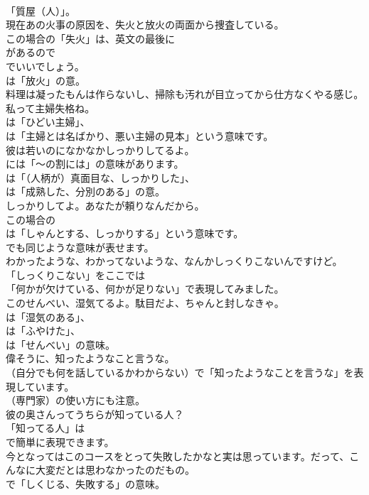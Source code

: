 \documentclass[8pt]{extreport}
\begin{document}
\begin{CJK}{UTF8}{min}
\\	「質屋（人）」。	
\\	現在あの火事の原因を、失火と放火の両面から捜査している。 
\\	この場合の「失火」は、英文の最後に 
\\	があるので 
\\	でいいでしょう。
\\	は「放火」の意。	
\\	料理は凝ったもんは作らないし、掃除も汚れが目立ってから仕方なくやる感じ。私って主婦失格ね。 
\\	は「ひどい主婦」、
\\	は「主婦とは名ばかり、悪い主婦の見本」という意味です。	
\\	彼は若いのになかなかしっかりしてるよ。 
\\	には「～の割には」の意味があります。
\\	は「（人柄が）真面目な、しっかりした」、
\\	は「成熟した、分別のある」の意。	
\\	しっかりしてよ。あなたが頼りなんだから。 
\\	この場合の
\\	は「しゃんとする、しっかりする」という意味です。
\\	でも同じような意味が表せます。	
\\	わかったような、わかってないような、なんかしっくりこないんですけど。 
\\	「しっくりこない」をここでは
\\	「何かが欠けている、何かが足りない」で表現してみました。	
\\	このせんべい、湿気てるよ。駄目だよ、ちゃんと封しなきゃ。 
\\	は「湿気のある」、
\\	は「ふやけた」、
\\	は「せんべい」の意味。	
\\	偉そうに、知ったようなこと言うな。 
\\	（自分でも何を話しているかわからない）で「知ったようなことを言うな」を表現しています。
\\	（専門家）の使い方にも注意。	
\\	彼の奥さんってうちらが知っている人？ 
\\	「知ってる人」は
\\	で簡単に表現できます。	
\\	今となってはこのコースをとって失敗したかなと実は思っています。だって、こんなに大変だとは思わなかったのだもの。 
\\	で「しくじる、失敗する」の意味。

\end{CJK}
\end{document}
